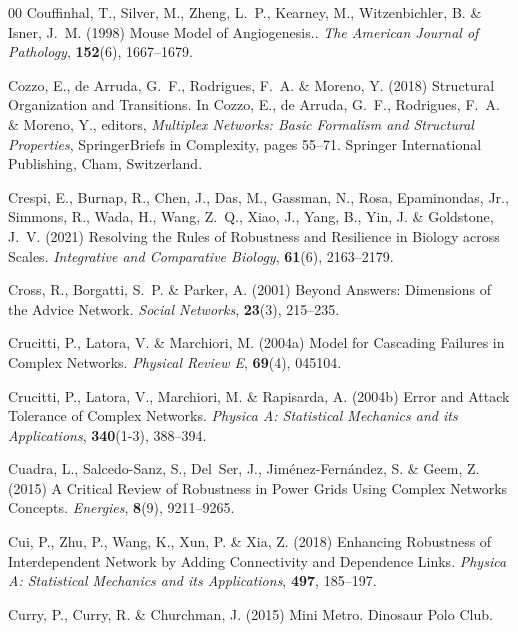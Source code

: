 \documentclass{comnet-mod}
\begin{document}
\begin{thebibliography}{00}
Couffinhal, T., Silver, M., Zheng, L.~P., Kearney, M., Witzenbichler, B. {\&}
  Isner, J.~M. (1998)  {Mouse Model of Angiogenesis.}. {\em {The American
  Journal of Pathology}}, \textbf{152}(6), 1667--1679.

Cozzo, E., {de Arruda}, G.~F., Rodrigues, F.~A. {\&} Moreno, Y. (2018)
  {Structural {{Organization}} and {{Transitions}}}. In Cozzo, E., {de Arruda},
  G.~F., Rodrigues, F.~A. {\&} Moreno, Y., editors, {\em {Multiplex
  {{Networks}}: {{Basic Formalism}} and {{Structural Properties}}}},
  {{SpringerBriefs}} in {{Complexity}}, pages 55--71. {Springer International
  Publishing}, {Cham, Switzerland}.

Crespi, E., Burnap, R., Chen, J., Das, M., Gassman, N., Rosa, Epaminondas,
  {\relax Jr}., Simmons, R., Wada, H., Wang, Z.~Q., Xiao, J., Yang, B., Yin, J.
  {\&} Goldstone, J.~V. (2021)  {Resolving the Rules of Robustness and
  Resilience in Biology across Scales}. {\em {Integrative and Comparative
  Biology}}, \textbf{61}(6), 2163--2179.

Cross, R., Borgatti, S.~P. {\&} Parker, A. (2001)  {Beyond Answers:
  {{Dimensions}} of the Advice Network}. {\em {Social Networks}},
  \textbf{23}(3), 215--235.

Crucitti, P., Latora, V. {\&} Marchiori, M. (2004a)  {Model for Cascading
  Failures in Complex Networks}. {\em {Physical Review E}}, \textbf{69}(4),
  045104.

Crucitti, P., Latora, V., Marchiori, M. {\&} Rapisarda, A. (2004b)  {Error and
  Attack Tolerance of Complex Networks}. {\em {Physica A: Statistical Mechanics
  and its Applications}}, \textbf{340}(1-3), 388--394.

Cuadra, L., {Salcedo-Sanz}, S., Del~Ser, J., {Jim{\'e}nez-Fern{\'a}ndez}, S.
  {\&} Geem, Z. (2015)  {A Critical Review of Robustness in Power Grids Using
  Complex Networks Concepts}. {\em {Energies}}, \textbf{8}(9), 9211--9265.

Cui, P., Zhu, P., Wang, K., Xun, P. {\&} Xia, Z. (2018)  {Enhancing Robustness
  of Interdependent Network by Adding Connectivity and Dependence Links}. {\em
  {Physica A: Statistical Mechanics and its Applications}}, \textbf{497},
  185--197.

Curry, P., Curry, R. {\&} Churchman, J. (2015)  {Mini Metro}. {Dinosaur Polo
  Club}.


\end{thebibliography}
\end{document}
